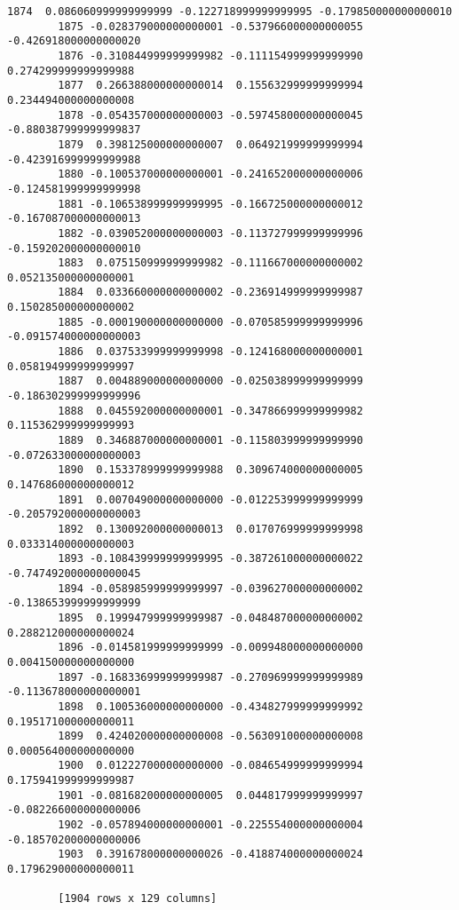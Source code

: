 \documentclass[11pt]{article}
\begin{document}
\begin{Verbatim}[commandchars=\\\{\}]
        1874  0.086060999999999999 -0.122718999999999995 -0.179850000000000010  
        1875 -0.028379000000000001 -0.537966000000000055 -0.426918000000000020  
        1876 -0.310844999999999982 -0.111154999999999990  0.274299999999999988  
        1877  0.266388000000000014  0.155632999999999994  0.234494000000000008  
        1878 -0.054357000000000003 -0.597458000000000045 -0.880387999999999837  
        1879  0.398125000000000007  0.064921999999999994 -0.423916999999999988  
        1880 -0.100537000000000001 -0.241652000000000006 -0.124581999999999998  
        1881 -0.106538999999999995 -0.166725000000000012 -0.167087000000000013  
        1882 -0.039052000000000003 -0.113727999999999996 -0.159202000000000010  
        1883  0.075150999999999982 -0.111667000000000002  0.052135000000000001  
        1884  0.033660000000000002 -0.236914999999999987  0.150285000000000002  
        1885 -0.000190000000000000 -0.070585999999999996 -0.091574000000000003  
        1886  0.037533999999999998 -0.124168000000000001  0.058194999999999997  
        1887  0.004889000000000000 -0.025038999999999999 -0.186302999999999996  
        1888  0.045592000000000001 -0.347866999999999982  0.115362999999999993  
        1889  0.346887000000000001 -0.115803999999999990 -0.072633000000000003  
        1890  0.153378999999999988  0.309674000000000005  0.147686000000000012  
        1891  0.007049000000000000 -0.012253999999999999 -0.205792000000000003  
        1892  0.130092000000000013  0.017076999999999998  0.033314000000000003  
        1893 -0.108439999999999995 -0.387261000000000022 -0.747492000000000045  
        1894 -0.058985999999999997 -0.039627000000000002 -0.138653999999999999  
        1895  0.199947999999999987 -0.048487000000000002  0.288212000000000024  
        1896 -0.014581999999999999 -0.009948000000000000  0.004150000000000000  
        1897 -0.168336999999999987 -0.270969999999999989 -0.113678000000000001  
        1898  0.100536000000000000 -0.434827999999999992  0.195171000000000011  
        1899  0.424020000000000008 -0.563091000000000008  0.000564000000000000  
        1900  0.012227000000000000 -0.084654999999999994  0.175941999999999987  
        1901 -0.081682000000000005  0.044817999999999997 -0.082266000000000006  
        1902 -0.057894000000000001 -0.225554000000000004 -0.185702000000000006  
        1903  0.391678000000000026 -0.418874000000000024  0.179629000000000011  
        
        [1904 rows x 129 columns]
\end{Verbatim}
            
\end{document}
